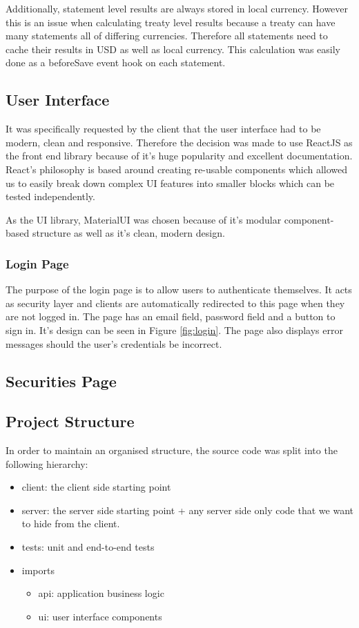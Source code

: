 \documentclass[12pt]{article}
\begin{document}
Additionally, statement level results are always stored in local currency. However this is an issue when calculating treaty level results because a treaty can have many statements all of differing currencies. Therefore all statements need to cache their results in USD as well as local currency. This calculation was easily done as a beforeSave event hook on each statement.

\subsection{User Interface}
It was specifically requested by the client that the user interface had to be modern, clean and responsive. Therefore the decision was made to use ReactJS \cite{react} as the front end library because of it's huge popularity and excellent documentation. React's philosophy is based around creating re-usable components which allowed us to easily break down complex UI features into smaller blocks which can be tested independently.

As the UI library, MaterialUI \cite{material_ui} was chosen because of it's modular component-based structure as well as it's clean, modern design.

\subsubsection{Login Page}
The purpose of the login page is to allow users to authenticate themselves. It acts as security layer and clients are automatically redirected to this page when they are not logged in. The page has an email field, password field and a button to sign in. It's design can be seen in Figure \ref{fig:login}. The page also displays error messages should the user's credentials be incorrect.

\subsection{Securities Page}

\subsection{Project Structure}
In order to maintain an organised structure, the source code was split into the following hierarchy:
\begin{itemize}
    \item client: the client side starting point
    \item server: the server side starting point + any server side only code that we want to hide from the client.
    \item tests: unit and end-to-end tests
    \item imports \begin{itemize}
              \item api: application business logic
              \item ui: user interface components
          \end{itemize}
\end{itemize}
\end{document}
